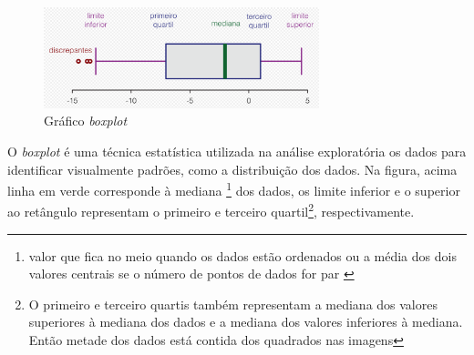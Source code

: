 \begin{figure}[H]
    \centering
    \includegraphics[width=8cm]{../figuras/explicacao-boxplot.png}
    \caption{Gráfico \textit{boxplot} \cite{explicacao-boxplot}}
    \label{fig:boxplot}
\end{figure}

O \textit{boxplot} \cite{boxplot} é
uma técnica estatística utilizada na análise exploratória
os dados para identificar visualmente padrões, como a distribuição
dos dados. Na figura, acima linha em verde corresponde à mediana \footnote{
valor que fica no meio quando os dados estão ordenados ou a média
dos dois valores centrais se o número de pontos de dados for par
\cite{boxplot-stat}} 
dos dados, os limite inferior e o superior ao retângulo representam
o primeiro e terceiro quartil\footnote{O primeiro e terceiro 
quartis também representam a mediana dos valores superiores
à mediana dos dados e a mediana dos valores inferiores à mediana. Então metade
dos dados está contida dos quadrados nas imagens}, respectivamente. 

